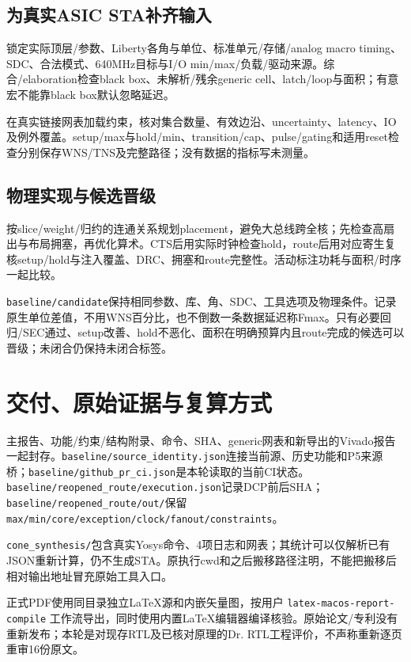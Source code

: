 \documentclass[UTF8,fontset=fandol,10pt,a4paper,openany]{ctexrep}
\newcommand{\code}[1]{\nolinkurl{#1}}
\begin{document}
\subsection{为真实ASIC STA补齐输入}


锁定实际顶层/参数、Liberty各角与单位、标准单元/存储/analog macro timing、SDC、合法模式、640MHz目标与I/O min/max/负载/驱动来源。综合/elaboration检查black box、未解析/残余generic cell、latch/loop与面积；有意宏不能靠black box默认忽略延迟。


在真实链接网表加载约束，核对集合数量、有效边沿、uncertainty、latency、IO及例外覆盖。setup/max与hold/min、transition/cap、pulse/gating和适用reset检查分别保存WNS/TNS及完整路径；没有数据的指标写未测量。


\subsection{物理实现与候选晋级}


按slice/weight/归约的连通关系规划placement，避免大总线跨全核；先检查高扇出与布局拥塞，再优化算术。CTS后用实际时钟检查hold，route后用对应寄生复核setup/hold与注入覆盖、DRC、拥塞和route完整性。活动标注功耗与面积/时序一起比较。


\code{baseline/candidate}保持相同参数、库、角、SDC、工具选项及物理条件。记录原生单位差值，不用WNS百分比，也不倒数一条数据延迟称Fmax。只有必要回归/SEC通过、setup改善、hold不恶化、面积在明确预算内且route完成的候选可以晋级；未闭合仍保持未闭合标签。


\section{交付、原始证据与复算方式}


主报告、功能/约束/结构附录、命令、SHA、generic网表和新导出的Vivado报告一起封存。\code{baseline/source_identity.json}连接当前源、历史功能和P5来源桥；\code{baseline/github_pr_ci.json}是本轮读取的当前CI状态。\code{baseline/reopened_route/execution.json}记录DCP前后SHA；\code{baseline/reopened_route/out/}保留\code{max/min/core/exception/clock/fanout/constraints}。


\code{cone_synthesis/}包含真实Yosys命令、4项日志和网表；其统计可以仅解析已有JSON重新计算，仍不生成STA。原执行cwd和之后搬移路径注明，不能把搬移后相对输出地址冒充原始工具入口。


正式PDF使用同目录独立LaTeX源和内嵌矢量图，按用户 \code{latex-macos-report-compile} 工作流导出，同时使用内置LaTeX编辑器编译核验。原始论文/专利没有重新发布；本轮是对现存RTL及已核对原理的Dr. RTL工程评价，不声称重新逐页重审16份原文。
\end{document}

